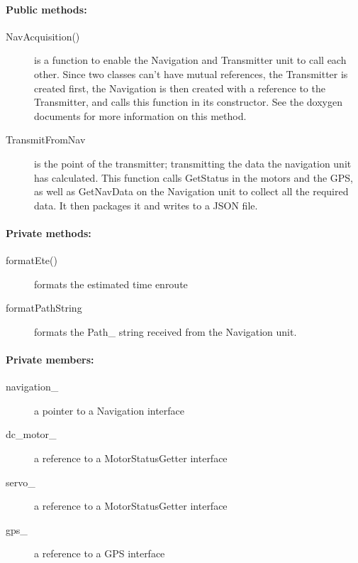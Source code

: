 \paragraph{Public methods:}
\begin{adjustwidth}{2.5em}{0pt}\begin{description}
		\item [NavAcquisition()] is a function to enable the Navigation and Transmitter unit to call each other. Since two classes can't have mutual references, the Transmitter is created first, the Navigation is then created with a reference to the Transmitter, and calls this function in its constructor. See the doxygen documents for more information on this method.
		\item [TransmitFromNav] is the point of the transmitter; transmitting the data the navigation unit has calculated. This function calls GetStatus in the motors and the GPS, as well as GetNavData on the Navigation unit to collect all the required data. It then packages it and writes to a JSON file. 
\end{description}\end{adjustwidth}

\paragraph{Private methods:}
\begin{adjustwidth}{2.5em}{0pt}\begin{description}
		\item [formatEte()] formats the estimated time enroute
		\item [formatPathString] formats the Path_ string received from the Navigation unit.
\end{description}\end{adjustwidth}

\paragraph{Private members:}
\begin{adjustwidth}{2.5em}{0pt}\begin{description}
		\item [navigation_] a pointer to a Navigation interface
		\item [dc_motor_] a reference to a MotorStatusGetter interface
		\item [servo_] a reference to a MotorStatusGetter interface
		\item [gps_] a reference to a GPS interface
\end{description}\end{adjustwidth}

